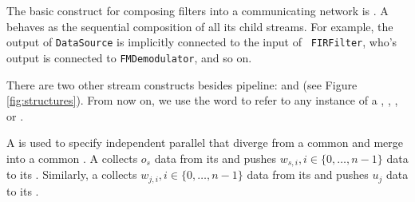 

The basic construct for composing filters into a communicating
network is {\pipeline}.  A {\pipeline} behaves as the sequential
composition of all its child streams.  For example, the output of
{\tt DataSource} is implicitly connected to the input of {\tt
FIRFilter}, who's output is connected to {\tt FMDemodulator}, and
so on.

There are two other stream constructs besides pipeline: {\splitjoin}
and {\feedbackloop} (see Figure \ref{fig:structures}). From now on,
we use the word \stream to refer to any instance of a {\filter},
{\pipeline}, {\splitjoin}, or {\feedbackloop}.

A {\splitjoin} is used to specify independent parallel \streams that
diverge from a common {\splitter} and merge into a common
{\joiner}. A {\splitter} collects $o_s$ data from its {\Input}
{\Channel} and pushes $w_{s,i}, i \in \{0,\dots,n-1\}$ data to its
{\Output} {\Channels}. Similarly, a {\joiner} collects $w_{j,i}, i \in
\{0,\dots,n-1\}$ data from its {\Input} {\Channel} and pushes $u_j$
data to its {\Output} {\Channel}.

\begin{comment}
There are two kinds of {\splitters}: 1) {\duplicate}, which replicates
each data item and sends a copy to each parallel \stream, and 2)
{\roundrobin}$(w_0, \dots, w_{n-1})$, which sends the first $w_0$
items to the first \stream, the next $w_1$ items to the second
\stream, and so on.  {\roundrobin} is also the only type of {\joiner}
that we support; its function is analogous to a {\roundrobin}
{\splitter}.  If a {\roundrobin} is written without any weights, we
assume that all $w_i = 1$. The {\splitter} and {\joiner} type are
specified with the keywords {\tt split} and {\tt join},
respectively (see Figure \ref{fig:radiocode}); the parallel
streams are specified by successive calls to {\tt add}, with the
$i$'th call setting the $i$'th stream in the splitjoin.
\end{comment}


